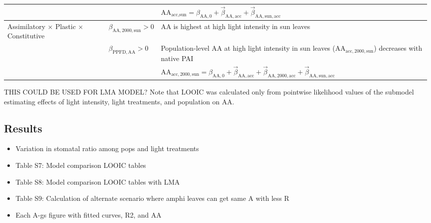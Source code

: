 \documentclass[
  letterpaper,
  DIV=11,
  numbers=noendperiod]{scrartcl}
\providecommand{\tightlist}{%
  \setlength{\itemsep}{0pt}\setlength{\parskip}{0pt}}\usepackage{longtable,booktabs,array}
\newcommand{\aax}{$\mathrm{AA}$}
\begin{document}
\begin{longtable}{>{\raggedright\arraybackslash}p{1in}>{\raggedright\arraybackslash}p{1.5in}>{\raggedright\arraybackslash}p{3in}}
\nopagebreak
 &  & \hspace{-1em}$\mathrm{AA}_{\text{acc},\text{sun}} = \beta_{\mathrm{AA}, 0} + \vec{\beta}_{\mathrm{AA}, \text{acc}} + \vec{\beta}_{\mathrm{AA}, \text{sun}, \text{acc}}$\\
\cmidrule{1-3}\pagebreak[0]
Assimilatory $\times$ Plastic $\times$ Constitutive & $\beta_{\mathrm{AA},2000,\text{sun}} > 0$ & \hspace{-1em}\aax{} is highest at high light intensity in sun leaves\\
\nopagebreak
 & $\beta_{\mathrm{PPFD,AA}} > 0$ & \hspace{-1em}Population-level \aax{} at high light intensity in sun leaves ($\mathrm{AA}_{\text{acc},2000,\text{sun}}$) decreases with native PAI\\
\nopagebreak
 &  & \hspace{-1em}$\mathrm{AA}_{\text{acc},2000,\text{sun}} = \beta_{\mathrm{AA}, 0} + \vec{\beta}_{\mathrm{AA}, \text{acc}} + \vec{\beta}_{\mathrm{AA}, 2000, \text{acc}} + \vec{\beta}_{\mathrm{AA}, \text{sun}, \text{acc}}$\\
\bottomrule

\end{longtable}

THIS COULD BE USED FOR LMA MODEL? Note that LOOIC was calculated only
from pointwise likelihood values of the submodel estimating effects of
light intensity, light treatments, and population on \aax{}.

\subsection{Results}\label{results}

\begin{itemize}
\tightlist
\item
  Variation in stomatal ratio among pops and light treatments
\item
  Table S7: Model comparison LOOIC tables
\item
  Table S8: Model comparison LOOIC tables with LMA
\item
  Table S9: Calculation of alternate scenario where amphi leaves can get
  same A with less R
\item
  Each A-gs figure with fitted curves, R2, and AA
\end{itemize}
\end{document}
